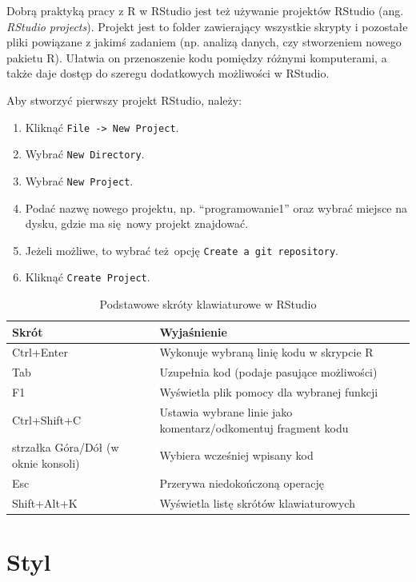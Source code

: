 \documentclass[paper=6in:9in,pagesize=pdftex,headinclude=on,footinclude=on,10pt]{scrbook}
\providecommand{\tightlist}{%
  \setlength{\itemsep}{0pt}\setlength{\parskip}{0pt}}
\begin{document}
Dobrą praktyką pracy z R w RStudio jest też używanie projektów RStudio (ang. \emph{RStudio projects}).
Projekt jest to folder zawierający wszystkie skrypty i pozostałe pliki powiązane z jakimś zadaniem (np. analizą danych, czy stworzeniem nowego pakietu R).
Ułatwia on przenoszenie kodu pomiędzy różnymi komputerami, a także daje dostęp do szeregu dodatkowych możliwości w RStudio.

Aby stworzyć pierwszy projekt RStudio, należy:

\begin{enumerate}
\def\labelenumi{\arabic{enumi}.}
\tightlist
\item
  Kliknąć \texttt{File\ -\textgreater{}\ New\ Project}.
\item
  Wybrać \texttt{New\ Directory}.
\item
  Wybrać \texttt{New\ Project}.
\item
  Podać nazwę nowego projektu, np. ``programowanie1'' oraz wybrać miejsce na dysku, gdzie ma się~nowy projekt znajdować.
\item
  Jeżeli możliwe, to wybrać też~opcję \texttt{Create\ a\ git\ repository}.
\item
  Kliknąć \texttt{Create\ Project}.
\end{enumerate}

\begin{table}[t]

\caption{\label{tab:rstudiosk}Podstawowe skróty klawiaturowe w RStudio}
\centering
\begin{tabular}{>{\raggedright\arraybackslash}p{12em}>{\raggedright\arraybackslash}p{18em}}
\toprule
Skrót & Wyjaśnienie\\
\midrule
Ctrl+Enter & Wykonuje wybraną linię kodu w skrypcie R\\
Tab & Uzupełnia kod (podaje pasujące możliwości)\\
F1 & Wyświetla plik pomocy dla wybranej funkcji\\
Ctrl+Shift+C & Ustawia wybrane linie jako komentarz/odkomentuj fragment kodu\\
strzałka Góra/Dół (w oknie konsoli) & Wybiera wcześniej wpisany kod\\
\addlinespace
Esc & Przerywa niedokończoną operację\\
Shift+Alt+K & Wyświetla listę skrótów klawiaturowych\\
\bottomrule
\end{tabular}
\end{table}

\hypertarget{styl}{%
\section{Styl}\label{styl}}
\end{document}
